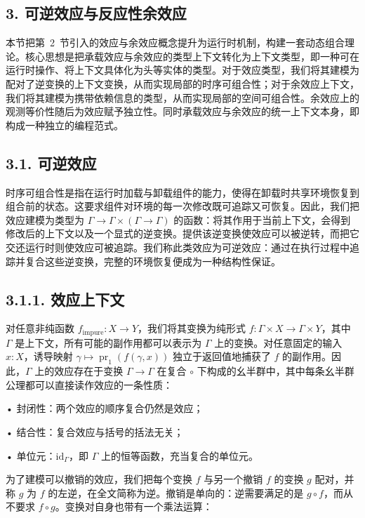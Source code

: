 \subsection{3. 可逆效应与反应性余效应}\label{revertible-efects-and-reactive-coefects}

本节把第~2~节引入的效应与余效应概念提升为运行时机制，构建一套动态组合理论。核心思想是把承载效应与余效应的类型上下文转化为上下文类型，即一种可在运行时操作、将上下文具体化为头等实体的类型。对于效应类型，我们将其建模为配对了逆变换的上下文变换，从而实现局部的时序可组合性；对于余效应上下文，我们将其建模为携带依赖信息的类型，从而实现局部的空间可组合性。余效应上的观测等价性随后为效应赋予独立性。同时承载效应与余效应的统一上下文本身，即构成一种独立的编程范式。

\subsection{3.1. 可逆效应}\label{revertible-efects}

时序可组合性是指在运行时加载与卸载组件的能力，使得在卸载时共享环境恢复到组合前的状态。这要求组件对环境的每一次修改既可追踪又可恢复。因此，我们把效应建模为类型为
\(\Gamma \to \Gamma \times ( \Gamma \to \Gamma )\)
的函数：将其作用于当前上下文，会得到修改后的上下文以及一个显式的逆变换。提供该逆变换使效应可以被逆转，而把它交还运行时则使效应可被追踪。我们称此类效应为可逆效应：通过在执行过程中追踪并复合这些逆变换，完整的环境恢复便成为一种结构性保证。

\subsection{3.1.1. 效应上下文}\label{efect-context}

对任意非纯函数 \(f _ { \mathrm { i m p u r e } } : X \to Y\)，我们将其变换为纯形式
\(f : \Gamma \times X \to \Gamma \times Y\)，其中 $\Gamma$ 是上下文，所有可能的副作用都可以表示为 $\Gamma$ 上的变换。对任意固定的输入 \(x : X\)，诱导映射
\(\gamma \mapsto \operatorname { p r } _ { 1 } ( f ( \gamma , x ) )\)
独立于返回值地捕获了 \(f\) 的副作用。因此，$\Gamma$ 上的效应存在于变换 $\Gamma \to \Gamma$ 在复合 \(\circ\) 下构成的幺半群中，其中每条幺半群公理都可以直接读作效应的一条性质：

• 封闭性：两个效应的顺序复合仍然是效应；

• 结合性：复合效应与括号的括法无关；

• 单位元：\({ \mathrm { i d } } _ { \Gamma }\)，即 $\Gamma$ 上的恒等函数，充当复合的单位元。

为了建模可以撤销的效应，我们把每个变换 \(f\) 与另一个撤销 \(f\) 的变换 \(g\) 配对，并称 \(g\) 为 \(f\) 的左逆，在全文简称为逆。撤销是单向的：逆需要满足的是 \(g \circ f\)，而从不要求 \(f \circ g\)。变换对自身也带有一个乘法运算：

